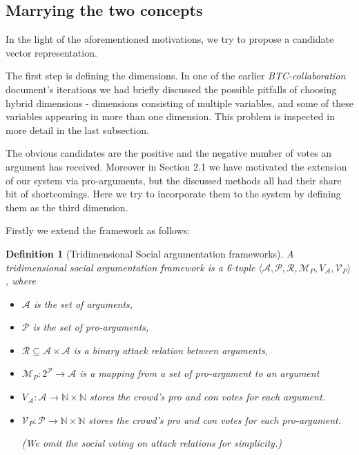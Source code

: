 \documentclass{article}
\newtheorem{definition}{Definition}
\newcommand{\nat}{\mathbb{N}}   %
\newcommand{\args}{\mathcal{A}} %
\newcommand{\att}{\mathcal{R}}  %
\newcommand{\varg}{V_{\args}}   %
\newcommand{\vatt}{V_{\att}}   %
\begin{document}
\subsection{Marrying the two concepts}
\label{sec:marry}

In the light of the aforementioned motivations, we try to propose a candidate vector representation. 

The first step is defining the dimensions. In one of the earlier \emph{BTC-collaboration} document's iterations we had briefly discussed the possible pitfalls of choosing hybrid dimensions - dimensions consisting of multiple variables, and some of these variables appearing in more than one dimension. This problem is inspected in more detail in the last subsection.

The obvious candidates are the positive and the negative number of votes an argument has received. Moreover in Section 2.1 we have motivated the extension of our system via pro-arguments, but the discussed methods all had their share bit of shortcomings. Here we try to incorporate them to the system by defining them as the third dimension.

Firstly we extend the framework as follows:

\begin{definition}[Tridimensional Social argumentation frameworks]
A tridimensional social argumentation framework is a 6-tuple $\langle \args, \mathcal{P}, \att, \mathcal{M}_P,  \varg, \mathcal{V}_P \rangle$, where
\begin{itemize}
  \item $\mathcal{A}$ is the set of arguments,
  \item  $\mathcal{P}$ is the set of pro-arguments,
  \item $\att \subseteq \args \times \args$ is a binary attack relation between arguments,
 \item $\mathcal{M}_P: 2^{\mathcal{P}} \to \args$ is a mapping from a set of pro-argument to an argument
  \item $\varg : \args \to \nat \times \nat$ stores the crowd's pro and con votes for each argument.
\item $\mathcal{V}_P : \mathcal{P} \to \nat \times \nat$ stores the crowd's pro and con votes for each pro-argument.

(We omit the social voting on attack relations for simplicity.)
\end{itemize}
\end{definition}
\end{document}
